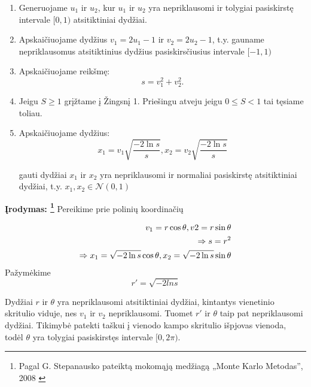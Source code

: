 \documentclass[12pt]{article}
\begin{document}
\begin{enumerate}
	
	\item Generuojame $u_1$ ir $u_2$, kur $u_1$ ir $u_2$ yra nepriklausomi ir tolygiai pasiskirstę intervale $[0,1)$ atsitiktiniai dydžiai.
	
	\item Apskaičiuojame dydžius $v_1=2u_1-1$ ir $v_2=2u_2-1$, t.y. gauname nepriklausomus atsitiktinius dydžius pasiskirsčiusius intervale $[-1,1)$
	
	\item Apskaičiuojame reikšmę:
	\begin{equation}
	s=v_1^2 + v_2^2.
	\end{equation} 
	
	\item Jeigu $S \geq 1$ grįžtame į Žingsnį 1. Priešingu atveju jeigu $ 0\leq S < 1$ tai tęsiame toliau.
	
	\item Apskaičiuojame dydžius:
	\begin{equation}
	x_1=v_1 \sqrt{\dfrac{-2 \ln{s}}{s}}, x_2=v_2 \sqrt{\dfrac{-2 \ln{s}}{s}}
	\end{equation}
	
	gauti dydžiai $x_1$ ir $x_2$ yra nepriklausomi ir normaliai pasiskirstę atsitiktiniai dydžiai, t.y. $x_1, x_2 \in \mathcal{N}(0,1) $ 
\end{enumerate}


{\bf Įrodymas: \footnote{Pagal G. Stepanausko pateiktą mokomąją medžiagą „Monte Karlo Metodas”, 2008 \cite[p.~70]{STEPANAUSKAS} }}
Pereikime prie polinių koordinačių

\begin{equation}
\begin{split}
v_1 = r \cos{\theta}, v2=r\sin{\theta} \\
\Rightarrow s=r^2\\
\Rightarrow x_1 = \sqrt{-2\ln{s}}\cos \theta, \space x_2 = \sqrt{-2\ln{s}}\sin \theta
\end{split} \nonumber
\end{equation}
Pažymėkime
\begin{equation}
r'=\sqrt{-2 ln{s}} \nonumber
\end{equation}

Dydžiai $r$ ir $\theta$ yra nepriklausomi atsitiktiniai dydžiai, kintantys vienetinio skritulio viduje, nes $v_1$ ir $v_2$ nepriklausomi. Tuomet $r'$ ir $\theta$ taip pat nepriklausomi dydžiai. Tikimybė patekti taškui į vienodo kampo skritulio išpjovas vienoda, todėl $\theta$ yra tolygiai pasiskirstęs intervale $[0,2\pi)$.
\end{document}
